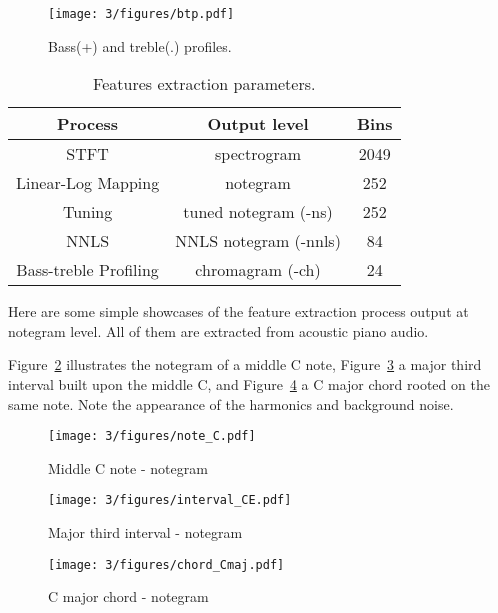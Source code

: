 \begin{figure}[htb]
\centering
\texttt{[image: 3/figures/btp.pdf]}
\caption{Bass(+) and treble(.) profiles.}
\label{fig:3-btprofile}
\end{figure}

\begin{table}[htb]
\caption{Features extraction parameters.}
\centering
\footnotesize
\begin{tabular}{|c|c|c|} \hline
 Process & Output level & Bins \\ \hline
 STFT & spectrogram & 2049 \\ \hline
 Linear-Log Mapping & notegram & 252  \\ \hline
 Tuning & tuned notegram (-ns) & 252 \\ \hline
 NNLS & NNLS notegram (-nnls) & 84  \\ \hline
 Bass-treble Profiling & chromagram (-ch) & 24 \\ \hline
\end{tabular}
\label{tab:3-felevels}
\end{table}

Here are some simple showcases of the feature extraction process output at notegram level. All of them are extracted from acoustic piano audio.

Figure~\ref{fig:3-note_C} illustrates the notegram of a middle C note, Figure~\ref{fig:3-interval_CE} a major third interval built upon the middle C, and Figure~\ref{fig:3-chord_Cmaj} a C major chord rooted on the same note. Note the appearance of the harmonics and background noise.

\begin{figure}
\centering
\texttt{[image: 3/figures/note\_C.pdf]}
\caption{Middle C note - notegram}
\label{fig:3-note_C}
\end{figure}

\begin{figure}
\centering
\texttt{[image: 3/figures/interval\_CE.pdf]}
\caption{Major third interval - notegram}
\label{fig:3-interval_CE}
\end{figure}

\begin{figure}
\centering
\texttt{[image: 3/figures/chord\_Cmaj.pdf]}
\caption{C major chord - notegram}
\label{fig:3-chord_Cmaj}
\end{figure}

